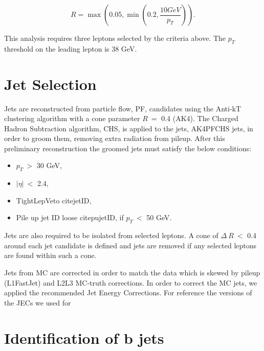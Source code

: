 \begin{equation}
R = \max (0.05, \min(0.2, \frac{10GeV}{p_T})).
\end{equation}

This analysis requires three leptons selected by the criteria above. The $p_{T}$ threshold on the leading lepton is 38 GeV.
\section{Jet Selection}
\label{sec:Jets}

Jets are reconstructed from particle flow, PF, candidates using the Anti-kT clustering algorithm with a cone parameter $R~=$ 0.4 (AK4). The Charged Hadron Subtraction algorithm, CHS, is applied to the jets, AK4PFCHS jets, in order to groom them, removing extra radiation from pileup. After this preliminary reconstruction the groomed jets must satisfy the below conditions:


\begin{itemize}
\item $p_{T}~>$ 30 GeV,
\item $|\eta|~<$ 2.4,
\item TightLepVeto cite{jetID},
\item Pile up jet ID loose cite{pujetID}, if $p_{T}~<$ 50 GeV.
\end{itemize}

Jets are also required to be isolated from selected leptons. A cone of $\Delta~R~<$ 0.4 around each jet candidate is defined and jets are removed if any selected leptons are found within such a cone.  

Jets from MC are corrected in order to match the data which is skewed by pileup (L1FastJet) and L2L3 MC-truth corrections. In order to correct the MC jets, we applied the recommended Jet Energy Corrections. For reference the versions of the JECs we used for
\section{Identification of b jets}
\label{sec:Btag}